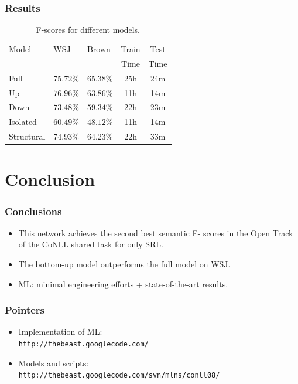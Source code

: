 \documentclass{beamer} \setbeamertemplate{navigation symbols}{}
\begin{document}
\begin{frame}
  \frametitle{Results}

  \begin{table}
    \begin{center}
      \small
      \begin{tabular}{|l|l|l|c|c|}\hline
        Model                & WSJ                & Brown              & Train & Test\\
        &                    &                    & Time & Time\\\hline\hline
        Full         & $75.72\%$          & $\mathbf{65.38}\%$ & 25h & 24m\\\hline
        Up           & $\mathbf{76.96\%}$ & $63.86\%$          & 11h & 14m\\\hline
        Down         & $73.48\%$          & $59.34\%$          & 22h & 23m\\\hline
        Isolated     & $60.49\%$          & $48.12\%$          & 11h & 14m\\\hline
        Structural   & $74.93\%$          & $64.23\%$          & 22h & 33m\\\hline   
      \end{tabular}
      \caption{F-scores for different models.}
      \label{tbl:results}
      \normalsize
    \end{center}
  \end{table}
\end{frame}

\section{Conclusion}
\begin{frame}
  \frametitle{Conclusions}

  \begin{itemize}
  \item This network achieves the second best semantic F- scores in
    the Open Track of the CoNLL shared task for only SRL.  \bigskip
  \item The bottom-up model outperforms the full model on WSJ.
  \item ML: minimal engineering efforts + state-of-the-art results.
  \end{itemize}
\end{frame}

\begin{frame}
  \frametitle{Pointers}

  \begin{itemize}
  \item Implementation of ML:\\
    \texttt{http://thebeast.googlecode.com/} \bigskip
  \item Models and scripts:\\
    \texttt{http://thebeast.googlecode.com/svn/mlns/conll08/}
  \end{itemize}
\end{frame}
\end{document}
